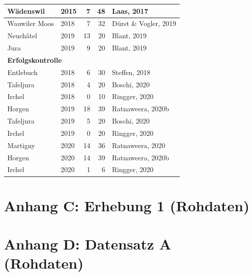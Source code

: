 \documentclass[
]{scrbook}
\begin{document}
\begin{table}
\begin{tabular}[t]{l|l|r|r|l}
\hline
\hspace{1em}Wädenswil & 2015 & 7 & 48 & Laas, 2017\\
\hline
\hspace{1em}Wauwiler Moos & 2018 & 7 & 32 & Dürst \& Vogler, 2019\\
\hline
\hspace{1em}Neuchâtel & 2019 & 13 & 20 & Blant, 2019\\
\hline
\hspace{1em}Jura & 2019 & 9 & 20 & Blant, 2019\\
\hline
\multicolumn{5}{l}{\textbf{Erfolgskontrolle}}\\
\hline
\hspace{1em}Entlebuch & 2018 & 6 & 30 & Steffen, 2018\\
\hline
\hspace{1em}Tafeljura & 2018 & 4 & 20 & Boschi, 2020\\
\hline
\hspace{1em}Irchel & 2018 & 0 & 10 & Ringger, 2020\\
\hline
\hspace{1em}Horgen & 2019 & 18 & 39 & Ratnaweera, 2020b\\
\hline
\hspace{1em}Tafeljura & 2019 & 5 & 20 & Boschi, 2020\\
\hline
\hspace{1em}Irchel & 2019 & 0 & 20 & Ringger, 2020\\
\hline
\hspace{1em}Martigny & 2020 & 14 & 36 & Ratnaweera, 2020\\
\hline
\hspace{1em}Horgen & 2020 & 14 & 39 & Ratnaweera, 2020b\\
\hline
\hspace{1em}Irchel & 2020 & 1 & 6 & Ringger, 2020\\
\hline
\end{tabular}
\end{table}

\hypertarget{anhang-c-erhebung-1-rohdaten}{%
\section{Anhang C: Erhebung 1 (Rohdaten)}\label{anhang-c-erhebung-1-rohdaten}}

\hypertarget{anhang-d-datensatz-a-rohdaten}{%
\section{Anhang D: Datensatz A (Rohdaten)}\label{anhang-d-datensatz-a-rohdaten}}
\end{document}
